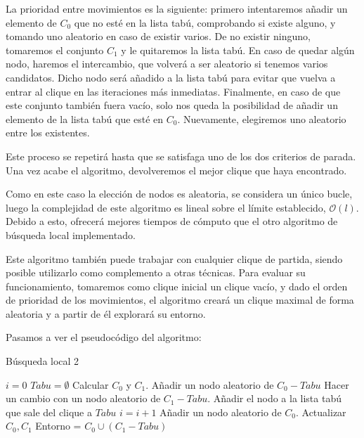 La prioridad entre movimientos es la siguiente: primero intentaremos añadir un elemento de
$C_0$ que no esté en la lista tabú, comprobando si existe alguno, y tomando uno aleatorio
en caso de existir varios. De no existir ninguno, tomaremos el conjunto $C_1$ y le quitaremos
la lista tabú. En caso de quedar algún nodo, haremos el intercambio, que volverá a ser aleatorio
si tenemos varios candidatos. Dicho nodo será añadido a la lista tabú para evitar que vuelva
a entrar al clique en las iteraciones más inmediatas. Finalmente, en caso de que este conjunto
también fuera vacío, solo nos queda la posibilidad de añadir un elemento de la lista tabú que
esté en $C_0$. Nuevamente, elegiremos uno aleatorio entre los existentes.

Este proceso se repetirá hasta que se satisfaga uno de los dos criterios de parada. Una vez
acabe el algoritmo, devolveremos el mejor clique que haya encontrado.

Como en este caso la elección de nodos es aleatoria, se considera un único bucle,
luego la complejidad de este algoritmo es lineal sobre el límite establecido,
$\mathcal{O}(l)$. Debido a esto, ofrecerá mejores tiempos de cómputo que el otro
algoritmo de búsqueda local implementado.

Este algoritmo también puede trabajar con cualquier clique de partida, siendo posible
utilizarlo como complemento a otras técnicas. Para evaluar su funcionamiento, tomaremos
como clique inicial un clique vacío, y dado el orden de prioridad de los movimientos,
el algoritmo creará un clique maximal de forma aleatoria y a partir de él explorará
su entorno.

Pasamos a ver el pseudocódigo del algoritmo:

\begin{algorithm}[H]
\caption{Búsqueda local 2}
  \begin{algorithmic}
    \State $i = 0$
    \State $Tabu = \emptyset$
    \State Calcular $C_0$ y $C_1$.
    \Repeat
        \State Añadir un nodo aleatorio de $C_0 - Tabu$
        \State Hacer un cambio con un nodo aleatorio de $C_1 - Tabu$.
        \State Añadir el nodo a la lista tabú que sale del clique a $Tabu$
        \State $i = i + 1$
        \State Añadir un nodo aleatorio de $C_0$.
      \EndIf
      \State Actualizar $C_0, C_1$
      \State Entorno = $C_0 \cup (C_1 - Tabu)$
  \end{algorithmic}
\end{algorithm}

